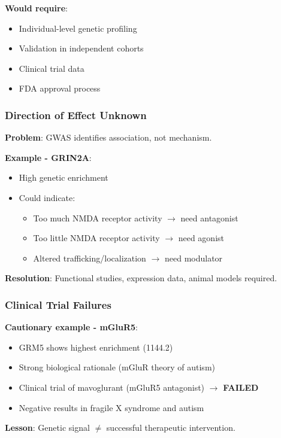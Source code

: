 \documentclass[12pt,letterpaper]{article}
\begin{document}
\textbf{Would require}:
\begin{itemize}
    \item Individual-level genetic profiling
    \item Validation in independent cohorts
    \item Clinical trial data
    \item FDA approval process
\end{itemize}

\subsubsection{Direction of Effect Unknown}

\textbf{Problem}: GWAS identifies association, not mechanism.

\textbf{Example - GRIN2A}:
\begin{itemize}
    \item High genetic enrichment
    \item Could indicate:
    \begin{itemize}
        \item Too much NMDA receptor activity $\rightarrow$ need antagonist
        \item Too little NMDA receptor activity $\rightarrow$ need agonist
        \item Altered trafficking/localization $\rightarrow$ need modulator
    \end{itemize}
\end{itemize}

\textbf{Resolution}: Functional studies, expression data, animal models required.

\subsubsection{Clinical Trial Failures}

\textbf{Cautionary example - mGluR5}:
\begin{itemize}
    \item GRM5 shows highest enrichment (1144.2)
    \item Strong biological rationale (mGluR theory of autism)
    \item Clinical trial of mavoglurant (mGluR5 antagonist) $\rightarrow$ \textbf{FAILED}
    \item Negative results in fragile X syndrome and autism
\end{itemize}

\textbf{Lesson}: Genetic signal $\neq$ successful therapeutic intervention.
\end{document}
